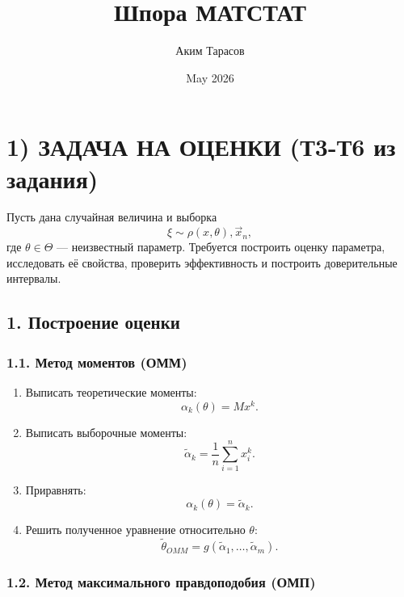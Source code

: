 \documentclass{article}
\title{Шпора МАТСТАТ}
\author{Аким Тарасов}
\date{May 2026}
\begin{document}
\section*{1) ЗАДАЧА НА ОЦЕНКИ (Т3-Т6 из задания)}

Пусть дана случайная величина и выборка
\[
\xi \sim \rho(x,\theta), \vec{x}_n, 
\]
где \(\theta \in \Theta\) --- неизвестный параметр. Требуется построить оценку параметра, исследовать её свойства, проверить эффективность и построить доверительные интервалы.

\subsection*{1. Построение оценки}

\subsubsection*{1.1. Метод моментов (ОММ)}

\begin{enumerate}
    \item Выписать теоретические моменты:
    \[
    \alpha_k(\theta)=M x^k.
    \]

    \item Выписать выборочные моменты:
    \[
    \widetilde{\alpha}_k=\frac1n\sum_{i=1}^n x_i^k.
    \]

    \item Приравнять:
    \[
    \alpha_k(\theta)=\widetilde{\alpha}_k.
    \]

    \item Решить полученное уравнение относительно \(\theta\):
    \[
    \widetilde{\theta}_{OMM}=g(\widetilde{\alpha}_1,\dots,\widetilde{\alpha}_m).
    \]
\end{enumerate}

\subsubsection*{1.2. Метод максимального правдоподобия (ОМП)}
\end{document}
